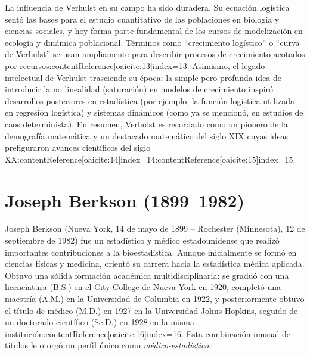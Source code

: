 \documentclass[12pt]{article}
\begin{document}
La influencia de Verhulst en su campo ha sido duradera. Su ecuación logística sentó las bases para el estudio cuantitativo de las poblaciones en biología y ciencias sociales, y hoy forma parte fundamental de los cursos de modelización en ecología y dinámica poblacional. Términos como “crecimiento logístico” o “curva de Verhulst” se usan ampliamente para describir procesos de crecimiento acotados por recursos:contentReference[oaicite:13]{index=13}. Asimismo, el legado intelectual de Verhulst trasciende su época: la simple pero profunda idea de introducir la no linealidad (saturación) en modelos de crecimiento inspiró desarrollos posteriores en estadística (por ejemplo, la función logística utilizada en regresión logística) y sistemas dinámicos (como ya se mencionó, en estudios de caos determinista). En resumen, Verhulst es recordado como un pionero de la demografía matemática y un destacado matemático del siglo XIX cuyas ideas prefiguraron avances científicos del siglo XX:contentReference[oaicite:14]{index=14}:contentReference[oaicite:15]{index=15}.

\section{Joseph Berkson (1899--1982)}

Joseph Berkson (Nueva York, 14 de mayo de 1899 – Rochester (Minnesota), 12 de septiembre de 1982) fue un estadístico y médico estadounidense que realizó importantes contribuciones a la bioestadística. Aunque inicialmente se formó en ciencias físicas y medicina, orientó su carrera hacia la estadística médica aplicada. Obtuvo una sólida formación académica multidisciplinaria: se graduó con una licenciatura (B.S.) en el City College de Nueva York en 1920, completó una maestría (A.M.) en la Universidad de Columbia en 1922, y posteriormente obtuvo el título de médico (M.D.) en 1927 en la Universidad Johns Hopkins, seguido de un doctorado científico (Sc.D.) en 1928 en la misma institución:contentReference[oaicite:16]{index=16}. Esta combinación inusual de títulos le otorgó un perfil único como \emph{médico-estadístico}.
\end{document}
